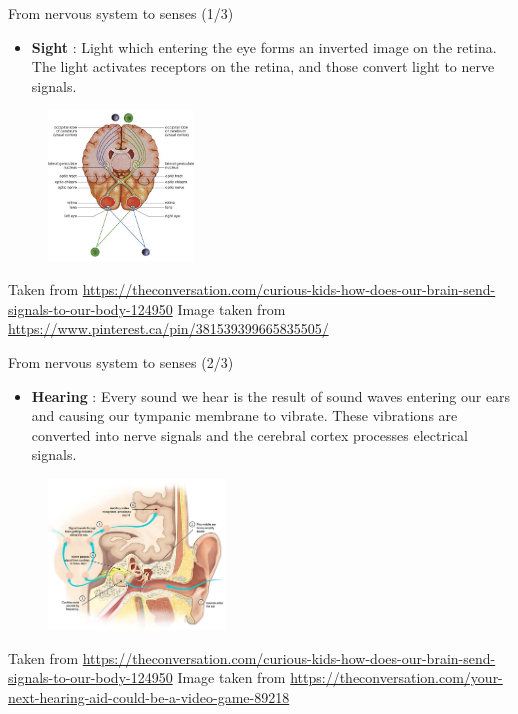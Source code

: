\documentclass{beamer}
\begin{document}
\begin{frame}
{\centerline{From nervous system to senses (1/3)}}
\begin{itemize}
    \item \textbf{Sight} : Light which entering the eye forms an inverted image on the retina. The light activates receptors on the retina, and those convert light to nerve signals.
\end{itemize}
\begin{figure}
    \centering
    \includegraphics[height=4cm]{P2023.AIBCCSS.BrainSignals/sight.jpg}
\end{figure}
\begin{center}
    \tiny{Taken from \url{https://theconversation.com/curious-kids-how-does-our-brain-send-signals-to-our-body-124950}}
    \tiny{Image taken from \url{https://www.pinterest.ca/pin/381539399665835505/}}
\end{center}    
\end{frame}

\begin{frame}
{\centerline{From nervous system to senses (2/3)}}
\begin{itemize}
    \item \textbf{Hearing} : Every sound we hear is the result of sound waves entering our ears and causing our tympanic membrane to vibrate. These vibrations are converted into nerve signals and the cerebral cortex processes electrical signals.
\end{itemize}
\begin{figure}
    \centering
    \includegraphics[height=4cm]{P2023.AIBCCSS.BrainSignals/hearing.jpg}
\end{figure}
\begin{center}
    \tiny{Taken from \url{https://theconversation.com/curious-kids-how-does-our-brain-send-signals-to-our-body-124950}}
    \tiny{Image taken from \url{https://theconversation.com/your-next-hearing-aid-could-be-a-video-game-89218}}
\end{center}    
\end{frame}
\end{document}
